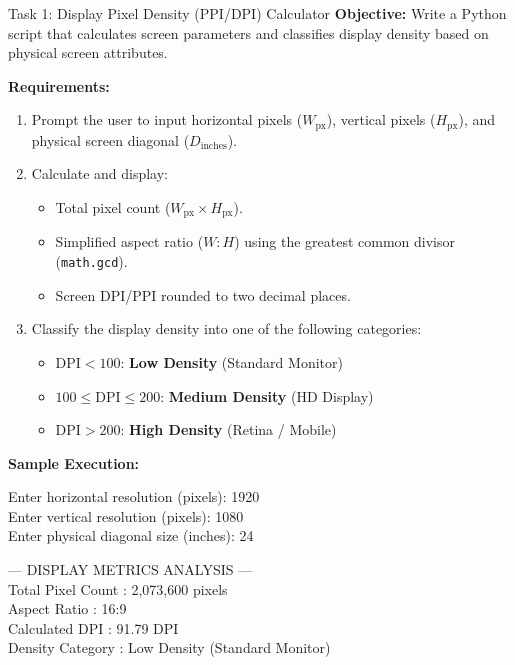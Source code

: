 \documentclass[12pt,a4paper]{article}
\begin{document}
\begin{taskbox}{Task 1: Display Pixel Density (PPI/DPI) Calculator}
\textbf{Objective:} Write a Python script that calculates screen parameters and classifies display density based on physical screen attributes.

\textbf{Requirements:}
\begin{enumerate}[leftmargin=*]
    \item Prompt the user to input horizontal pixels ($W_{\text{px}}$), vertical pixels ($H_{\text{px}}$), and physical screen diagonal ($D_{\text{inches}}$).
    \item Calculate and display:
    \begin{itemize}[leftmargin=*]
        \item Total pixel count ($W_{\text{px}} \times H_{\text{px}}$).
        \item Simplified aspect ratio ($W : H$) using the greatest common divisor (\texttt{math.gcd}).
        \item Screen DPI/PPI rounded to two decimal places.
    \end{itemize}
    \item Classify the display density into one of the following categories:
    \begin{itemize}[leftmargin=*]
        \item $\text{DPI} < 100$: \textbf{Low Density} (Standard Monitor)
        \item $100 \le \text{DPI} \le 200$: \textbf{Medium Density} (HD Display)
        \item $\text{DPI} > 200$: \textbf{High Density} (Retina / Mobile)
    \end{itemize}
\end{enumerate}
\end{taskbox}

\vspace{0.3em}
\textbf{Sample Execution:}

\begin{sampleinputbox}
Enter horizontal resolution (pixels): 1920\\
Enter vertical resolution (pixels): 1080\\
Enter physical diagonal size (inches): 24
\end{sampleinputbox}

\begin{sampleoutputbox}
\color{white}\ttfamily
--- DISPLAY METRICS ANALYSIS ---\\
Total Pixel Count : 2,073,600 pixels\\
Aspect Ratio      : 16:9\\
Calculated DPI    : 91.79 DPI\\
Density Category  : Low Density (Standard Monitor)
\end{sampleoutputbox}
\end{document}
